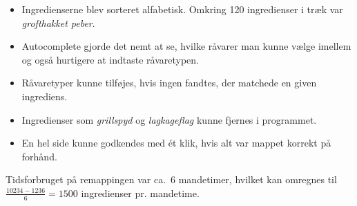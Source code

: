 \begin{itemize} [noitemsep]
\item Ingredienserne blev sorteret alfabetisk. Omkring 120 ingredienser i træk var \textit{grofthakket peber}.
\item Autocomplete gjorde det nemt at se, hvilke råvarer man kunne vælge imellem og også hurtigere at indtaste råvaretypen.
\item Råvaretyper kunne tilføjes, hvis ingen fandtes, der matchede en given ingrediens.
\item Ingredienser som \fx \textit{grillspyd} og \textit{lagkageflag} kunne fjernes i programmet.
\item En hel side kunne godkendes med ét klik, hvis alt var mappet korrekt på forhånd.
\end{itemize}

Tidsforbruget på remappingen var ca.\ 6 mandetimer, hvilket kan omregnes til $\frac{10234 - 1236}{6} = 1500$ ingredienser pr. mandetime.
